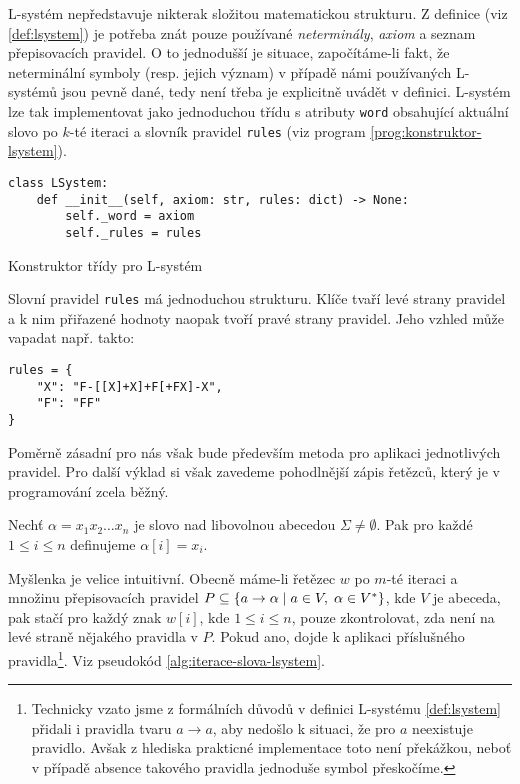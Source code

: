 L-systém nepředstavuje nikterak složitou matematickou strukturu. Z definice (viz \ref{def:lsystem}) je potřeba znát pouze používané \emph{neterminály}, \emph{axiom} a seznam přepisovacích pravidel. O to jednodušší je situace, započítáme-li fakt, že neterminální symboly (resp. jejich význam) v případě námi používaných L-systémů jsou pevně dané, tedy není třeba je explicitně uvádět v definici. L-systém lze tak implementovat jako jednoduchou třídu s atributy \texttt{word} obsahující aktuální slovo po $k$-té iteraci a slovník pravidel \texttt{rules} (viz program \ref{prog:konstruktor-lsystem}).
\begin{program}[h]
    \begin{lstlisting}[style=python]
class LSystem:
    def __init__(self, axiom: str, rules: dict) -> None:
        self._word = axiom
        self._rules = rules
\end{lstlisting}
    \caption{Konstruktor třídy pro L-systém}
    \label{prog:konstruktor-lsystem}
\end{program}
Slovní pravidel \texttt{rules} má jednoduchou strukturu. Klíče tvaří levé strany pravidel a k nim přiřazené hodnoty naopak tvoří pravé strany pravidel. Jeho vzhled může vapadat např. takto:
\begin{verbatim}
rules = {
    "X": "F-[[X]+X]+F[+FX]-X",
    "F": "FF"
}
\end{verbatim}
Poměrně zásadní pro nás však bude především metoda pro aplikaci jednotlivých pravidel. Pro další výklad si však zavedeme pohodlnější zápis řetězců, který je v programování zcela běžný.
\begin{definition}\label{def:index-retezce}
    Nechť $\alpha=x_1x_2\ldots x_n$ je slovo nad libovolnou abecedou $\Sigma\neq\emptyset$. Pak pro každé $1\leqslant i\leqslant n$ definujeme $\alpha[i]=x_i$.
\end{definition}
Myšlenka je velice intuitivní. Obecně máme-li řetězec $w$ po $m$-té iteraci a množinu přepisovacích pravidel $P\subseteq\left\{a\to\alpha\mid a\in V,\;\alpha\in V^*\right\}$, kde $V$ je abeceda, pak stačí pro každý znak $w[i]$, kde $1\leqslant i\leqslant n$, pouze zkontrolovat, zda není na levé straně nějakého pravidla v $P$. Pokud ano, dojde k aplikaci příslušného pravidla\footnote{Technicky vzato jsme z formálních důvodů v definici L-systému \ref{def:lsystem} přidali i pravidla tvaru $a\to a$, aby nedošlo k situaci, že pro $a$ neexistuje pravidlo. Avšak z hlediska prakticné implementace toto není překážkou, neboť v případě absence takového pravidla jednoduše symbol přeskočíme.}. Viz pseudokód \ref{alg:iterace-slova-lsystem}.
